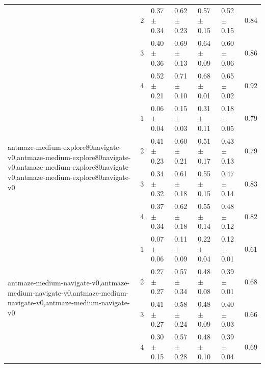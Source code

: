\begin{tabular}{lllllll}
 & 2 & 0.37 $\pm$ 0.34 & 0.62 $\pm$ 0.23 & 0.57 $\pm$ 0.15 & 0.52 $\pm$ 0.15 & 0.84 \\
 & 3 & 0.40 $\pm$ 0.36 & 0.69 $\pm$ 0.13 & 0.64 $\pm$ 0.09 & 0.60 $\pm$ 0.06 & 0.86 \\
 & 4 & 0.52 $\pm$ 0.21 & 0.71 $\pm$ 0.10 & 0.68 $\pm$ 0.01 & 0.65 $\pm$ 0.02 & 0.92 \\
\cline{1-7}
\multirow[t]{4}{*}{antmaze-medium-explore80navigate-v0,antmaze-medium-explore80navigate-v0,antmaze-medium-explore80navigate-v0,antmaze-medium-explore80navigate-v0} & 1 & 0.06 $\pm$ 0.04 & 0.15 $\pm$ 0.03 & 0.31 $\pm$ 0.11 & 0.18 $\pm$ 0.05 & 0.79 \\
 & 2 & 0.41 $\pm$ 0.23 & 0.60 $\pm$ 0.21 & 0.51 $\pm$ 0.17 & 0.43 $\pm$ 0.13 & 0.79 \\
 & 3 & 0.34 $\pm$ 0.32 & 0.61 $\pm$ 0.18 & 0.55 $\pm$ 0.15 & 0.47 $\pm$ 0.14 & 0.83 \\
 & 4 & 0.37 $\pm$ 0.34 & 0.62 $\pm$ 0.18 & 0.55 $\pm$ 0.14 & 0.48 $\pm$ 0.12 & 0.82 \\
\cline{1-7}
\multirow[t]{4}{*}{antmaze-medium-navigate-v0,antmaze-medium-navigate-v0,antmaze-medium-navigate-v0,antmaze-medium-navigate-v0} & 1 & 0.07 $\pm$ 0.06 & 0.11 $\pm$ 0.09 & 0.22 $\pm$ 0.04 & 0.12 $\pm$ 0.01 & 0.61 \\
 & 2 & 0.27 $\pm$ 0.27 & 0.57 $\pm$ 0.34 & 0.48 $\pm$ 0.08 & 0.39 $\pm$ 0.01 & 0.68 \\
 & 3 & 0.41 $\pm$ 0.27 & 0.58 $\pm$ 0.24 & 0.48 $\pm$ 0.09 & 0.40 $\pm$ 0.03 & 0.66 \\
 & 4 & 0.30 $\pm$ 0.15 & 0.57 $\pm$ 0.28 & 0.48 $\pm$ 0.10 & 0.39 $\pm$ 0.04 & 0.69 \\
\cline{1-7}
\bottomrule
\end{tabular}

